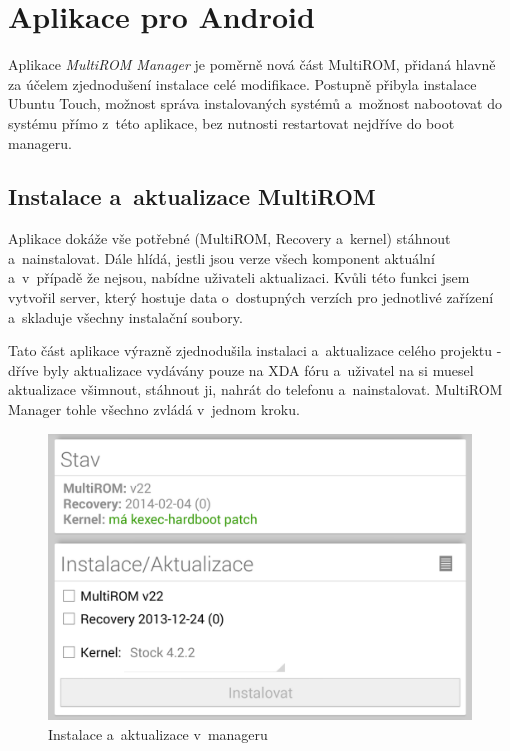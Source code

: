 \documentclass[12pt, a4paper, oneside]{article}
\newcommand{\It}{\textit}  %
\begin{document}
\section{Aplikace pro Android}
Aplikace \It{MultiROM Manager} je poměrně nová část MultiROM, přidaná hlavně za účelem zjednodušení instalace celé modifikace. Postupně přibyla instalace Ubuntu Touch, možnost správa instalovaných systémů a~možnost nabootovat do systému přímo z~této aplikace, bez nutnosti restartovat nejdříve do boot manageru.

\subsection{Instalace a~aktualizace MultiROM}
Aplikace dokáže vše potřebné (MultiROM, Recovery a~kernel) stáhnout a~nainstalovat. Dále hlídá, jestli jsou verze všech komponent aktuální a~v~případě že nejsou, nabídne uživateli aktualizaci. Kvůli této funkci jsem vytvořil server, který hostuje data o~dostupných verzích pro jednotlivé zařízení a~skladuje všechny instalační soubory.

Tato část aplikace výrazně zjednodušila instalaci a~aktualizace celého projektu - dříve byly aktualizace vydávány pouze na XDA fóru a~uživatel na si muesel aktualizace všimnout, stáhnout ji, nahrát do telefonu a~nainstalovat. MultiROM Manager tohle všechno zvládá v~jednom kroku.

\begin{figure}[H]
\begin{center}
 \includegraphics[width=\textwidth]{img/mgr_install.png}
\caption{Instalace a~aktualizace v~manageru}
\end{center}
\end{figure}
\end{document}
